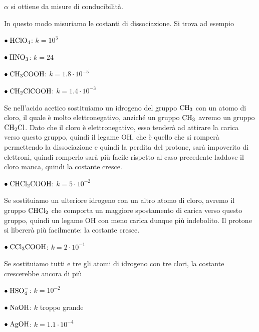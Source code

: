 $\alpha$ si ottiene da misure di conducibilità.

In questo modo misuriamo le costanti di dissociazione. Si trova ad esempio

\vspace{0.2cm}$\bullet \; \rm HClO_4$: $k=10^3$

\vspace{0.2cm}$\bullet \; \rm HNO_3$: $k=24$

\vspace{0.2cm}$\bullet \; \rm CH_3COOH$: $k=1.8 \cdot 10^{-5}$

\vspace{0.2cm}$\bullet \; \rm CH_2ClCOOH$: $k=1.4 \cdot 10^{-3}$

\vspace{0.2cm}Se nell'acido acetico sostituiamo un idrogeno del gruppo $\rm CH_3$ con un atomo di cloro, il quale è molto elettronegativo, anziché un gruppo $\rm CH_3$ avremo un gruppo $\rm CH_2Cl$. Dato che il cloro è elettronegativo, esso tenderà ad attirare la carica verso questo gruppo, quindi il legame OH, che è quello che si romperà permettendo la dissociazione e quindi la perdita del protone, sarà impoverito di elettroni, quindi romperlo sarà più facile rispetto al caso precedente laddove il cloro manca, quindi la costante cresce.

\vspace{0.2cm}$\bullet \; \rm CHCl_2COOH$: $k=5 \cdot 10^{-2}$

\vspace{0.2cm}Se sostituiamo un ulteriore idrogeno con un altro atomo di cloro, avremo il gruppo $\rm CHCl_2$ che comporta un maggiore spostamento di carica verso questo gruppo, quindi un legame OH con meno carica dunque più indebolito. Il protone si libererà più facilmente: la costante cresce.

\vspace{0.2cm}$\bullet \; \rm CCl_3COOH$: $k=2 \cdot 10^{-1}$

\vspace{0.2cm}Se sostituiamo tutti e tre gli atomi di idrogeno con tre clori, la costante crescerebbe ancora di più

\vspace{0.2cm}$\bullet \; \rm HSO_4^-$: $k=10^{-2}$

\vspace{0.2cm}$\bullet \; \rm NaOH$: $k$ troppo grande

\vspace{0.2cm}$\bullet \; \rm AgOH$: $k=1.1 \cdot 10^{-4}$

